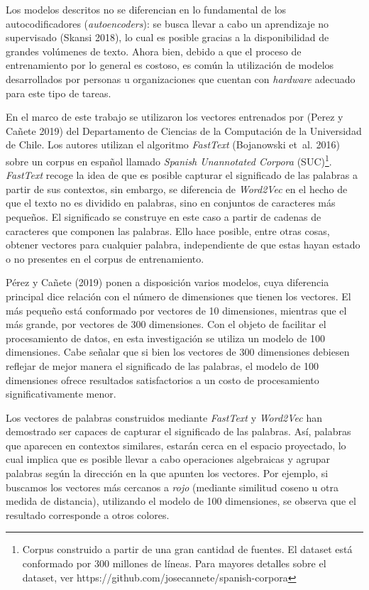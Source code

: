 \documentclass[
  12pt,
]{article}
\begin{document}
Los modelos descritos no se diferencian en lo fundamental de los
autocodificadores (\emph{autoencoders}): se busca llevar a cabo un
aprendizaje no supervisado (Skansi 2018), lo cual es posible gracias a
la disponibilidad de grandes volúmenes de texto. Ahora bien, debido a
que el proceso de entrenamiento por lo general es costoso, es común la
utilización de modelos desarrollados por personas u organizaciones que
cuentan con \emph{hardware} adecuado para este tipo de tareas.

En el marco de este trabajo se utilizaron los vectores entrenados por
(Perez y Cañete 2019) del Departamento de Ciencias de la Computación de
la Universidad de Chile. Los autores utilizan el algoritmo
\emph{FastText} (Bojanowski et~al. 2016) sobre un corpus en español
llamado \emph{Spanish Unannotated Corpora}
(SUC)\footnote{Corpus construido a partir de una gran cantidad de fuentes. El dataset está conformado por 300 millones de líneas. Para mayores detalles sobre el dataset, ver https://github.com/josecannete/spanish-corpora}.
\emph{FastText} recoge la idea de que es posible capturar el significado
de las palabras a partir de sus contextos, sin embargo, se diferencia de
\emph{Word2Vec} en el hecho de que el texto no es dividido en palabras,
sino en conjuntos de caracteres más pequeños. El significado se
construye en este caso a partir de cadenas de caracteres que componen
las palabras. Ello hace posible, entre otras cosas, obtener vectores
para cualquier palabra, independiente de que estas hayan estado o no
presentes en el corpus de entrenamiento.

Pérez y Cañete (2019) ponen a disposición varios modelos, cuya
diferencia principal dice relación con el número de dimensiones que
tienen los vectores. El más pequeño está conformado por vectores de 10
dimensiones, mientras que el más grande, por vectores de 300
dimensiones. Con el objeto de facilitar el procesamiento de datos, en
esta investigación se utiliza un modelo de 100 dimensiones. Cabe señalar
que si bien los vectores de 300 dimensiones debiesen reflejar de mejor
manera el significado de las palabras, el modelo de 100 dimensiones
ofrece resultados satisfactorios a un costo de procesamiento
significativamente menor.

Los vectores de palabras construidos mediante \emph{FastText} y
\emph{Word2Vec} han demostrado ser capaces de capturar el significado de
las palabras. Así, palabras que aparecen en contextos similares, estarán
cerca en el espacio proyectado, lo cual implica que es posible llevar a
cabo operaciones algebraicas y agrupar palabras según la dirección en la
que apunten los vectores. Por ejemplo, si buscamos los vectores más
cercanos a \emph{rojo} (mediante similitud coseno u otra medida de
distancia), utilizando el modelo de 100 dimensiones, se observa que el
resultado corresponde a otros colores.
\end{document}
